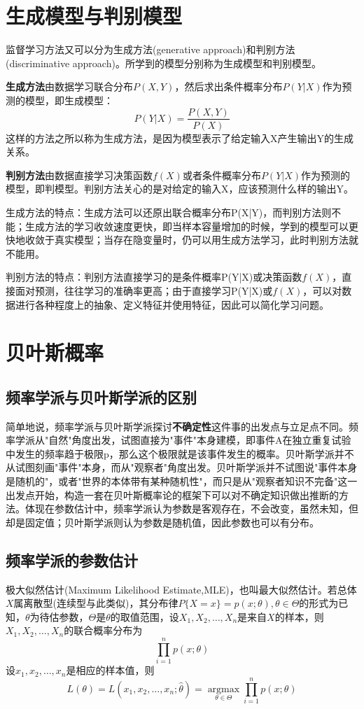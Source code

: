 \section{生成模型与判别模型}
监督学习方法又可以分为生成方法(generative approach)和判别方法(discriminative approach)。所学到的模型分别称为生成模型和判别模型。

\textbf{生成方法}由数据学习联合分布$P(X,Y)$，然后求出条件概率分布$P(Y|X)$作为预测的模型，即生成模型：
\begin{equation}
	P(Y|X) = \frac{P(X,Y)}{P(X)}
\end{equation}
这样的方法之所以称为生成方法，是因为模型表示了给定输入X产生输出Y的生成关系。

\textbf{判别方法}由数据直接学习决策函数$f(X)$或者条件概率分布$P(Y|X)$作为预测的模型，即判模型。判别方法关心的是对给定的输入X，应该预测什么样的输出Y。

生成方法的特点：生成方法可以还原出联合概率分布P(X|Y)，而判别方法则不能；生成方法的学习收敛速度更快，即当样本容量增加的时候，学到的模型可以更快地收敛于真实模型；当存在隐变量时，仍可以用生成方法学习，此时判别方法就不能用。

判别方法的特点：判别方法直接学习的是条件概率P(Y|X)或决策函数$f(X)$，直接面对预测，往往学习的准确率更高；由于直接学习P(Y|X)或$f(X)$，可以对数据进行各种程度上的抽象、定义特征并使用特征，因此可以简化学习问题。

\section{贝叶斯概率}
\subsection*{频率学派与贝叶斯学派的区别}
简单地说，频率学派与贝叶斯学派探讨\textbf{不确定性}这件事的出发点与立足点不同。频率学派从"自然"角度出发，试图直接为"事件"本身建模，即事件A在独立重复试验中发生的频率趋于极限p，那么这个极限就是该事件发生的概率。贝叶斯学派并不从试图刻画"事件"本身，而从"观察者"角度出发。贝叶斯学派并不试图说"事件本身是随机的"，或者"世界的本体带有某种随机性"，而只是从"观察者知识不完备"这一出发点开始，构造一套在贝叶斯概率论的框架下可以对不确定知识做出推断的方法。体现在参数估计中，频率学派认为参数是客观存在，不会改变，虽然未知，但却是固定值；贝叶斯学派则认为参数是随机值，因此参数也可以有分布。
\subsection*{频率学派的参数估计}
极大似然估计(Maximum Likelihood Estimate,MLE)，也叫最大似然估计。若总体$X$属离散型(连续型与此类似)，其分布律$P\{X=x\}=p(x;\theta),\theta\in \Theta$的形式为已知，$\theta$为待估参数，$\Theta$是$\theta$的取值范围，设$X_1,X_2,\dots,X_n$是来自$X$的样本，则$X_1,X_2,\dots,X_n$的联合概率分布为
\begin{equation}
	\prod_{i=1}^{n}p(x;\theta)
\end{equation}
设$x_1,x_2,\dots,x_n$是相应的样本值，则
\begin{equation}
	L(\theta)=L(x_1,x_2,\dots,x_n;\hat{\theta})=\mathop{\mathrm{argmax}}\limits_{\theta\in\Theta}\prod_{i=1}^{n}p(x;\theta)
\end{equation}

